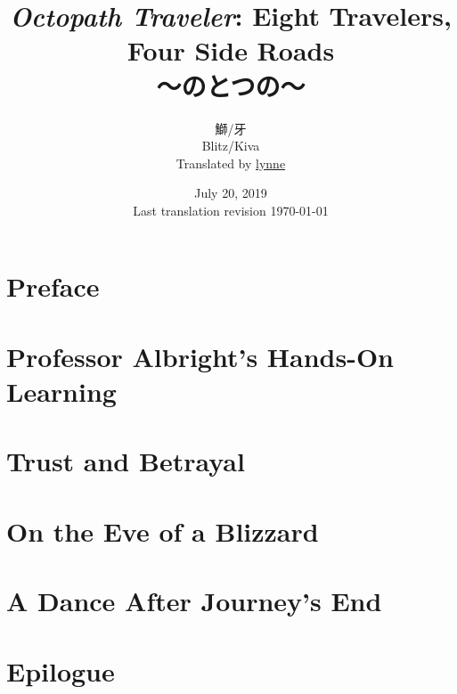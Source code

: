 \documentclass[a4paper,11pt]{memoir}
\title{%
\emph{Octopath Traveler}: Eight Travelers, Four Side Roads \\
\large{～\ruby{八人}{はちにん}の\ruby{旅人}{たびびと}と\ruby{四}{よっ}つの\ruby{道草}{みちくさ}～}
}
\author{%
鰤/牙 \\
Blitz/Kiva \\
Translated by \href{https://lynne.bearblog.dev}{lynne}
}
\date{%
July 20, 2019 \\
Last translation revision \today
}
\begin{document}
	\maketitle
	\pagebreak
	\tableofcontents*
	\frontmatter
	\chapter{Preface}
		
	\mainmatter
	\chapter{Professor Albright's Hands-On Learning}
		
	\chapter{Trust and Betrayal}
		
	\chapter{On the Eve of a Blizzard}
	\chapter{A Dance After Journey's End}
		
	\chapter{Epilogue}
\end{document}
